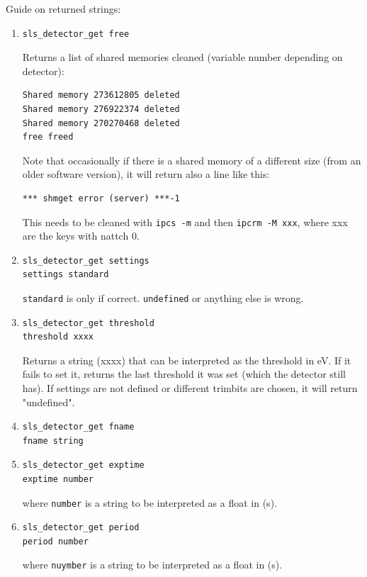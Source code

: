 \documentclass{article}
\begin{document}
Guide on returned strings:
\begin{enumerate}
\item \begin{verbatim}
sls_detector_get free
\end{verbatim}
Returns a list of shared memories cleaned (variable number depending on detector):
\begin{verbatim}
Shared memory 273612805 deleted
Shared memory 276922374 deleted
Shared memory 270270468 deleted
free freed
\end{verbatim}
Note that occasionally if there is a shared memory of a different size (from an older software version), it will return also a line like this:
\begin{verbatim}
*** shmget error (server) ***-1
\end{verbatim}
This needs to be cleaned with {\tt{ipcs -m}} and then {\tt{ipcrm -M xxx}}, where xxx are the keys with nattch 0. 
\item \begin{verbatim}sls_detector_get settings
settings standard
\end{verbatim} 
{\tt{standard}} is only if correct. {\tt{undefined}} or anything else is wrong. 

\item \begin{verbatim}
sls_detector_get threshold
threshold xxxx
\end{verbatim}
Returns a string (xxxx) that can be interpreted as the threshold in eV. If it fails to set it, returns the last threshold it was set (which the detector still has). If settings are not defined or different trimbits are chosen, it will return "undefined".

\item \begin{verbatim}
sls_detector_get fname
fname string
\end{verbatim}

\item \begin{verbatim}
sls_detector_get exptime
exptime number
\end{verbatim}
where {\tt{number}} is a string to be interpreted as a float in (s). 

\item \begin{verbatim}
sls_detector_get period
period number
\end{verbatim}
where {\tt{nuymber}} is a string to be interpreted as a float in (s). 


\end{enumerate}
\end{document}
